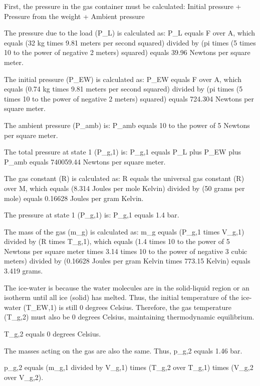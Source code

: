 First, the pressure in the gas container must be calculated:
Initial pressure + Pressure from the weight + Ambient pressure

The pressure due to the load (P_L) is calculated as:
P_L equals F over A, which equals (32 kg times 9.81 meters per second squared) divided by (pi times (5 times 10 to the power of negative 2 meters) squared) equals 39.96 Newtons per square meter.

The initial pressure (P_EW) is calculated as:
P_EW equals F over A, which equals (0.74 kg times 9.81 meters per second squared) divided by (pi times (5 times 10 to the power of negative 2 meters) squared) equals 724.304 Newtons per square meter.

The ambient pressure (P_amb) is:
P_amb equals 10 to the power of 5 Newtons per square meter.

The total pressure at state 1 (P_g,1) is:
P_g,1 equals P_L plus P_EW plus P_amb equals 740059.44 Newtons per square meter.

The gas constant (R) is calculated as:
R equals the universal gas constant (R) over M, which equals (8.314 Joules per mole Kelvin) divided by (50 grams per mole) equals 0.16628 Joules per gram Kelvin.

The pressure at state 1 (P_g,1) is:
P_g,1 equals 1.4 bar.

The mass of the gas (m_g) is calculated as:
m_g equals (P_g,1 times V_g,1) divided by (R times T_g,1), which equals (1.4 times 10 to the power of 5 Newtons per square meter times 3.14 times 10 to the power of negative 3 cubic meters) divided by (0.16628 Joules per gram Kelvin times 773.15 Kelvin) equals 3.419 grams.

The ice-water is because the water molecules are in the solid-liquid region or an isotherm until all ice (solid) has melted. Thus, the initial temperature of the ice-water (T_EW,1) is still 0 degrees Celsius. Therefore, the gas temperature (T_g,2) must also be 0 degrees Celsius, maintaining thermodynamic equilibrium.

T_g,2 equals 0 degrees Celsius.

The masses acting on the gas are also the same. Thus, p_g,2 equals 1.46 bar.

p_g,2 equals (m_g,1 divided by V_g,1) times (T_g,2 over T_g,1) times (V_g,2 over V_g,2).